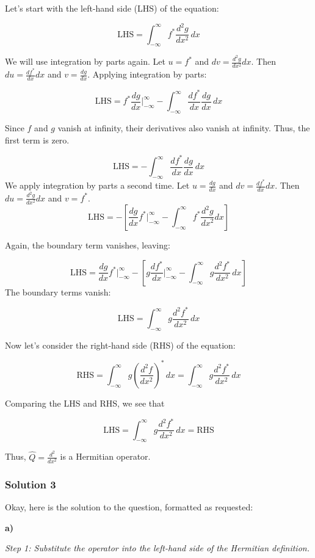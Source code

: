 \documentclass{article}
\begin{document}
Let's start with the left-hand side (LHS) of the equation:

\[
\text{LHS} = \int_{-\infty}^{\infty} f^* \frac{d^2g}{dx^2} \, dx
\]

We will use integration by parts again. Let $u = f^*$ and $dv = \frac{d^2g}{dx^2}dx$. Then $du = \frac{df^*}{dx}dx$ and $v = \frac{dg}{dx}$. Applying integration by parts:

\[
\text{LHS} = f^* \frac{dg}{dx} \Big|_{-\infty}^{\infty} - \int_{-\infty}^{\infty} \frac{df^*}{dx} \frac{dg}{dx} \, dx
\]

Since $f$ and $g$ vanish at infinity, their derivatives also vanish at infinity. Thus, the first term is zero.

\[
\text{LHS} = - \int_{-\infty}^{\infty} \frac{df^*}{dx} \frac{dg}{dx} \, dx
\]
We apply integration by parts a second time. Let $u = \frac{dg}{dx}$ and $dv = \frac{df^*}{dx}dx$. Then $du = \frac{d^2g}{dx^2}dx$ and $v = f^*$.
\[
\text{LHS} = - \left[ \frac{dg}{dx} f^* \Big|_{-\infty}^{\infty} - \int_{-\infty}^{\infty} f^* \frac{d^2g}{dx^2} dx \right]
\]

Again, the boundary term vanishes, leaving:

\[
\text{LHS} = \frac{dg}{dx} f^* \Big|_{-\infty}^{\infty} - \left[ g \frac{df^*}{dx} \Big|_{-\infty}^{\infty} - \int_{-\infty}^{\infty} g \frac{d^2 f^*}{dx^2} \, dx \right]
\]
The boundary terms vanish:

\[
\text{LHS} =  \int_{-\infty}^{\infty} g \frac{d^2 f^*}{dx^2} \, dx
\]

Now let's consider the right-hand side (RHS) of the equation:

\[
\text{RHS} = \int_{-\infty}^{\infty} g \left(\frac{d^2 f}{dx^2}\right)^* \, dx = \int_{-\infty}^{\infty} g \frac{d^2 f^*}{dx^2} \, dx
\]

Comparing the LHS and RHS, we see that

\[
\text{LHS} = \int_{-\infty}^{\infty} g \frac{d^2 f^*}{dx^2} \, dx = \text{RHS}
\]

Thus, $\hat{Q} = \frac{d^2}{dx^2}$ is a Hermitian operator.

\subsubsection{Solution 3}
Okay, here is the solution to the question, formatted as requested:

\textbf{a)}

\textit{Step 1: Substitute the operator into the left-hand side of the Hermitian definition.}
\end{document}
